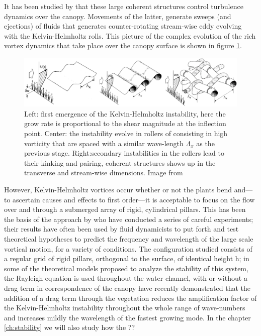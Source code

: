 It has been studied by \citet{finnigan2000turbulence} that these large coherent structures control turbulence dynamics over the canopy. Movements of the latter, generate sweeps (and ejections) of fluids that generates counter-rotating stream-wise eddy evolving with the Kelvin-Helmholtz rolls.
This picture of the complex evolution of the rich vortex dynamics that take place over the canopy surface is shown in figure \ref{fig:monai_evol}.

\begin{figure}[h]
	\centering
	\includegraphics[width=1\linewidth]{chapter_1/finn}
	\caption{Left: first emergence of the Kelvin-Helmholtz instability, here the grow rate is proportional to the shear magnitude at the inflection point. Center: the instability evolve in rollers of consisting in high vorticity that are spaced with a similar wave-length $\Lambda_x$ as the previous stage.  Right:secondary instabilities in the rollers lead to their kinking and pairing, coherent structures shows up in the transverse and stream-wise dimensions. Image from \citet{finnigan2000turbulence}}
	\label{fig:monai_evol}
\end{figure}


However, Kelvin-Helmholtz vortices occur whether or not the plants bend and—to ascertain causes and effects to first order—it is acceptable to focus on the flow over and through a submerged array of rigid, cylindrical pillars.
This has been the basis of the approach by \citet{ghisalberti2002mixing} \citet{ghisalberti2004limited} \citet{ghisalberti2005mass} who have conducted a series of careful experiments; their results have often been
used by fluid dynamicists to put forth and test theoretical hypotheses to predict the frequency and
wavelength of the large scale vortical motion, for a variety of conditions.
The configuration studied consists of a regular grid of rigid pillars, orthogonal to the surface, of identical height h; in some
of the theoretical models proposed to analyze the stability of this system, the Rayleigh equation is
used throughout the water channel, with or without a drag term in correspondence of the canopy \citet{raupach1996coherent} \citet{py2004mixing} \citet{singh2016linear} \citet{zampogna2016instability} have recently demonstrated that the addition of a drag term through the vegetation reduces the amplification factor of the Kelvin-Helmholtz instability throughout the whole
range of wave-numbers and increases mildly the wavelength of the fastest growing mode.
In the chapter \ref{ch:stability} we will also study how the ??





